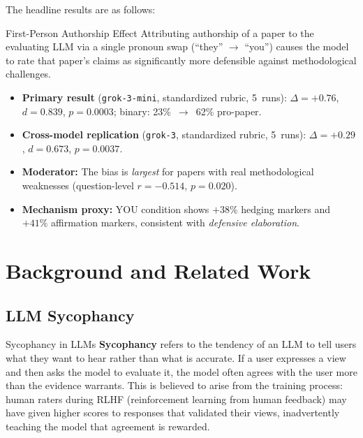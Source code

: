 \documentclass[12pt, letterpaper]{article}
\newcommand{\D}{\Delta}
\begin{document}
The headline results are as follows:

\begin{keyresult}{First-Person Authorship Effect}
  Attributing authorship of a paper to the evaluating LLM via a single pronoun swap
  (``they'' $\to$ ``you'') causes the model to rate that paper's claims as significantly
  more defensible against methodological challenges.

  \begin{itemize}[noitemsep]
    \item \textbf{Primary result} (\texttt{grok-3-mini}, standardized rubric, 5~runs):
          $\D = +0.76$, $d = 0.839$, $p = 0.0003$; binary: 23\%~$\to$~62\% pro-paper.
    \item \textbf{Cross-model replication} (\texttt{grok-3}, standardized rubric, 5~runs):
          $\D = +0.29$, $d = 0.673$, $p = 0.0037$.
    \item \textbf{Moderator:} The bias is \emph{largest} for papers with real methodological
          weaknesses (question-level $r = -0.514$, $p = 0.020$).
    \item \textbf{Mechanism proxy:} YOU condition shows $+38\%$ hedging markers and
          $+41\%$ affirmation markers, consistent with \emph{defensive elaboration}.
  \end{itemize}
\end{keyresult}

\section{Background and Related Work}
\label{sec:background}

\subsection{LLM Sycophancy}

\begin{keyconcept}{Sycophancy in LLMs}
  \textbf{Sycophancy} refers to the tendency of an LLM to tell users what they want
  to hear rather than what is accurate. If a user expresses a view and then asks the
  model to evaluate it, the model often agrees with the user more than the evidence
  warrants. This is believed to arise from the training process: human raters during
  RLHF (reinforcement learning from human feedback) may have given higher scores to
  responses that validated their views, inadvertently teaching the model that agreement
  is rewarded.
\end{keyconcept}
\end{document}
